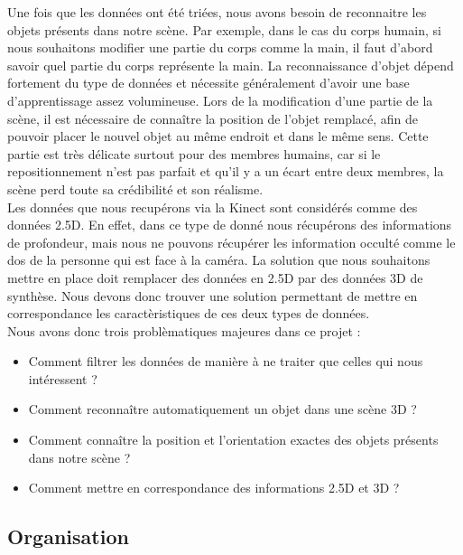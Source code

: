 Une fois que les données ont été triées, nous avons besoin de reconnaitre les objets présents dans notre scène. Par exemple, dans
le cas du corps humain, si nous souhaitons modifier une partie du corps comme la main, il faut d'abord savoir quel partie du corps représente 
la main. La reconnaissance d'objet dépend fortement du type de données et nécessite généralement d'avoir une base d'apprentissage 
assez volumineuse. Lors de la modification d'une partie de la scène, il est nécessaire de connaître la position de l'objet remplacé, afin de pouvoir
placer le nouvel objet au même endroit et dans le même sens. Cette partie est très délicate surtout pour des membres humains, car
si le repositionnement n'est pas parfait et qu'il y a un écart entre deux membres, la scène perd toute sa crédibilité et son 
réalisme.\\

Les données que nous recupérons via la Kinect sont considérés comme des données 2.5D. En effet, dans ce type de donné nous récupérons des 
informations de profondeur, mais nous ne pouvons récupérer les information occulté comme le dos de la personne qui est face à la caméra.
La solution que nous souhaitons mettre en place doit remplacer des données en 2.5D par des données 3D de synthèse. Nous devons donc
trouver une solution permettant de mettre en correspondance les caractèristiques de ces deux types de données.\\

Nous avons donc trois problèmatiques majeures dans ce projet : 
\begin{itemize}
  \item Comment filtrer les données de manière à ne traiter que celles qui nous intéressent ?
  \item Comment reconnaître automatiquement un objet dans une scène 3D ?
  \item Comment connaître la position et l'orientation exactes des objets présents dans notre scène ?
  \item Comment mettre en correspondance des informations 2.5D et 3D ?
\end{itemize}

\subsection{Organisation}

